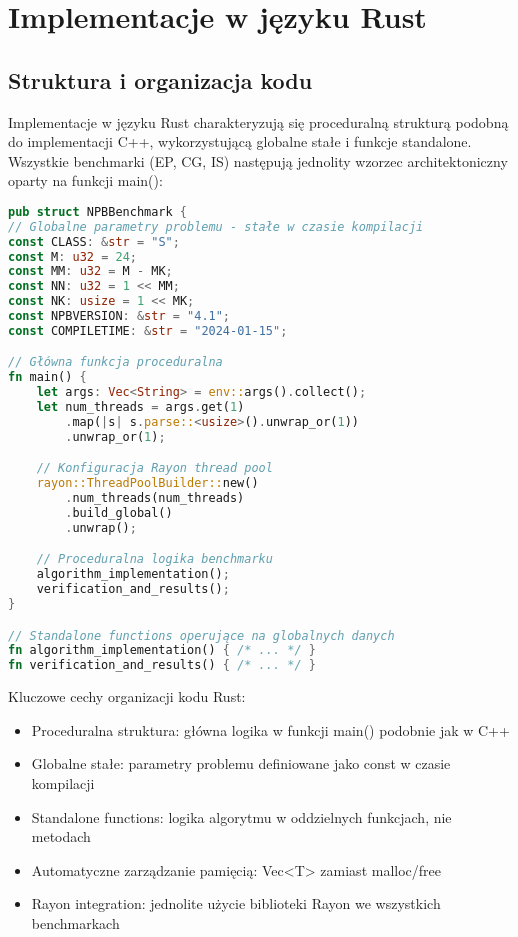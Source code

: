 \section{Implementacje w języku Rust}
\subsection{Struktura i organizacja kodu}
Implementacje w języku Rust charakteryzują się proceduralną strukturą podobną do implementacji C++, wykorzystującą globalne stałe i funkcje standalone. Wszystkie benchmarki (EP, CG, IS) następują jednolity wzorzec architektoniczny oparty na funkcji main():

\begin{lstlisting}[language=Rust, caption={Struktura kodu benchmarków w języku Rust}, label={lst:rust_structure}]
pub struct NPBBenchmark {
// Globalne parametry problemu - stałe w czasie kompilacji
const CLASS: &str = "S";
const M: u32 = 24;
const MM: u32 = M - MK;
const NN: u32 = 1 << MM;
const NK: usize = 1 << MK;
const NPBVERSION: &str = "4.1";
const COMPILETIME: &str = "2024-01-15";

// Główna funkcja proceduralna
fn main() {
    let args: Vec<String> = env::args().collect();
    let num_threads = args.get(1)
        .map(|s| s.parse::<usize>().unwrap_or(1))
        .unwrap_or(1);

    // Konfiguracja Rayon thread pool
    rayon::ThreadPoolBuilder::new()
        .num_threads(num_threads)
        .build_global()
        .unwrap();

    // Proceduralna logika benchmarku
    algorithm_implementation();
    verification_and_results();
}

// Standalone functions operujące na globalnych danych
fn algorithm_implementation() { /* ... */ }
fn verification_and_results() { /* ... */ }
\end{lstlisting}
Kluczowe cechy organizacji kodu Rust:
\begin{itemize}
    \item Proceduralna struktura: główna logika w funkcji main() podobnie jak w C++
    \item Globalne stałe: parametry problemu definiowane jako const w czasie kompilacji
    \item Standalone functions: logika algorytmu w oddzielnych funkcjach, nie metodach
    \item Automatyczne zarządzanie pamięcią: Vec<T> zamiast malloc/free
    \item Rayon integration: jednolite użycie biblioteki Rayon we wszystkich benchmarkach
\end{itemize}


